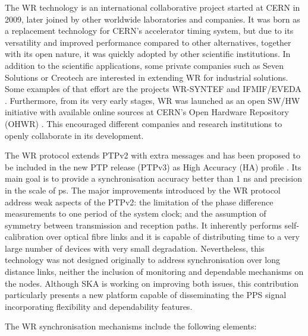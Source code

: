 The WR technology \cite{Wlostowski2011} is an international collaborative
project started at CERN in 2009, later joined by other worldwide laboratories and companies. It was born as a replacement technology for CERN's accelerator timing system, but due to its versatility and improved performance compared to other alternatives, together with its open nature, it was quickly adopted by other scientific institutions. In addition to the scientific applications, some private companies such as Seven Solutions or Creotech are interested in extending WR for industrial solutions. Some examples of that effort are the projects WR-SYNTEF \cite{web:creotech_projects} and IFMIF/EVEDA \cite{web:seven_projects}. 
Furthermore, from its very early stages, WR was launched as an open SW/HW initiative with available online sources at CERN's Open Hardware Repository (OHWR) \cite{ohwr:repo}. This encouraged different companies and research institutions to openly collaborate in its development.

The WR protocol extends PTPv2 with extra messages and has been proposed to be
included in the new PTP release (PTPv3) as High Accuracy (HA) profile
\cite{wr:maciej-ptpv3-standard} . Its main goal is to provide a synchronisation
accuracy better than 1 ns and precision in the scale of ps. The major
improvements introduced by the WR protocol address weak aspects of the PTPv2:
the limitation of the phase difference measurements to one period of the system
clock; and the assumption of symmetry between transmission and reception
paths. It inherently performs self-calibration over optical fibre links and it
is capable of distributing time to a very large number of devices with very
small degradation. Nevertheless, this technology was not designed originally
to address synchronisation over long distance links, neither the inclusion of monitoring and dependable mechanisms on the nodes. Although SKA is working on improving both issues, this contribution particularly presents a new platform capable of disseminating the PPS signal incorporating flexibility and dependability features. 

The WR synchronisation mechanisms include the following elements:

